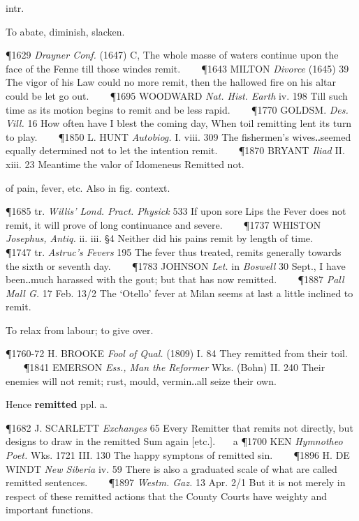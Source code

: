 \begin{description}[wide, labelwidth=!, labelindent=0pt]
\begin{myenumerate}
 intr.

 To abate, diminish, slacken.

\P 1629 \textit{Drayner  Conf.} (1647) C, The whole masse of waters continue upon the face of the Fenne till those windes remit.    
\P 1643 MILTON  \textit{Divorce} (1645) 39 The vigor of his Law could no more remit, then the hallowed fire on his altar could be let go out.    
\P 1695 WOODWARD  \textit{Nat. Hist. Earth} iv. 198 Till such time as its motion begins to remit and be less rapid.    
\P 1770 GOLDSM.  \textit{Des. Vill.} 16 How often have I blest the coming day, When toil remitting lent its turn to play.    
\P 1850 L. HUNT  \textit{Autobiog.} I. viii. 309 The fishermen's wives‥seemed equally determined not to let the intention remit.    
\P 1870 BRYANT  \textit{Iliad} II. xiii. 23 Meantime the valor of Idomeneus Remitted not.

 of pain, fever, etc. Also in fig. context.

\P 1685 tr.  \textit{Willis' Lond. Pract. Physick} 533 If upon sore Lips the Fever does not remit, it will prove of long continuance and severe.    
\P 1737 WHISTON  \textit{Josephus, Antiq.} ii. iii. §4 Neither did his pains remit by length of time.    
\P 1747 tr.  \textit{Astruc's Fevers} 195 The fever thus treated, remits generally towards the sixth or seventh day.    
\P 1783 JOHNSON \textit{Let.} in  \textit{Boswell} 30 Sept., I have been‥much harassed with the gout; but that has now remitted.    
\P 1887  \textit{Pall Mall G.} 17 Feb. 13/2 The ‘Otello’ fever at Milan seems at last a little inclined to remit.

 To relax from labour; to give over.

\P 1760-72 H. BROOKE  \textit{Fool of Qual.} (1809) I. 84 They remitted from their toil.    
\P 1841 EMERSON  \textit{Ess., Man the Reformer} Wks. (Bohn) II. 240 Their enemies will not remit; rust, mould, vermin‥all seize their own.

\noindent Hence \textbf{remitted} ppl. a.

\P 1682 J. SCARLETT  \textit{Exchanges} 65 Every Remitter that remits not directly, but designs to draw in the remitted Sum again [etc.].    a 
\P 1700 KEN  \textit{Hymnotheo Poet.} Wks. 1721 III.  130 The happy symptons of remitted sin.    
\P 1896 H. DE WINDT  \textit{New Siberia} iv. 59 There is also a graduated scale of what are called remitted sentences.    
\P 1897  \textit{Westm. Gaz.} 13 Apr. 2/1 But it is not merely in respect of these remitted actions that the County Courts have weighty and important functions.
\end{myenumerate}


\end{description}
